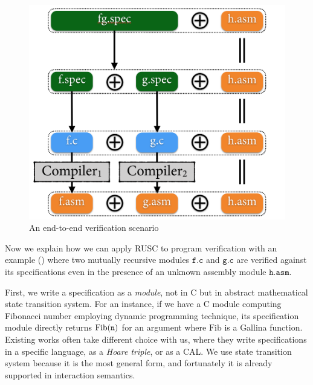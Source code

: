 \begin{figure}[t]
\centerline{\includegraphics[width=0.90\linewidth]{images/program-verif.png}}
\caption{An end-to-end verification scenario}
\label{fig:program-verif}
\end{figure}



Now we explain how we can apply RUSC to program verification with an example () where two mutually recursive modules $\texttt{f.c}$ and $\texttt{g.c}$ are verified against its specifications even in the presence of an unknown assembly module $\texttt{h.asm}$.

First, we write a specification as a {\it module}, not in C but in abstract mathematical state transition system. %
For an instance, if we have a C module computing Fibonacci number employing dynamic programming technique, its specification module directly returns $\mathrm{Fib}(\texttt{n})$ for an argument  where $\mathrm{Fib}$ is a Gallina function.
Existing works\cite{lorch:armada, jung:irisjfp, VST, gu:dscal} often take different choice with us, where they write specifications in a specific language, as a {\it Hoare triple}, or as a CAL.
We use state transition system because it is the most general form, and fortunately it is already supported in interaction semantics. %

